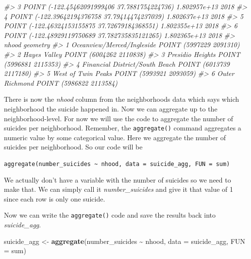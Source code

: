 \documentclass[
  12pt,
]{book}
\newenvironment{Shaded}{\begin{snugshade}}{\end{snugshade}}
\newcommand{\CommentTok}[1]{\textcolor[rgb]{0.37,0.37,0.37}{\textit{#1}}}
\newcommand{\DataTypeTok}[1]{\textcolor[rgb]{0.27,0.27,0.27}{#1}}
\newcommand{\DecValTok}[1]{\textcolor[rgb]{0.06,0.06,0.06}{#1}}
\newcommand{\KeywordTok}[1]{\textcolor[rgb]{0.27,0.27,0.27}{\textbf{#1}}}
\newcommand{\NormalTok}[1]{#1}
\newcommand{\OperatorTok}[1]{\textcolor[rgb]{0.43,0.43,0.43}{\textbf{#1}}}
\newcommand{\StringTok}[1]{\textcolor[rgb]{0.5,0.5,0.5}{#1}}
\begin{document}
\begin{Shaded}
\begin{Highlighting}[]
\CommentTok{\#\textgreater{} 3   POINT ({-}122.45462091999406 37.7881754224736) 1.802957e+13 2018}
\CommentTok{\#\textgreater{} 4  POINT ({-}122.39642194376758 37.79414474237039) 1.802637e+13 2018}
\CommentTok{\#\textgreater{} 5  POINT ({-}122.46324153155875 37.72679184368551) 1.802355e+13 2018}
\CommentTok{\#\textgreater{} 6 POINT ({-}122.48929119750689 37.782735835121265) 1.802365e+13 2018}
\CommentTok{\#\textgreater{}                            nhood                geometry}
\CommentTok{\#\textgreater{} 1     Oceanview/Merced/Ingleside POINT (5997229 2091310)}
\CommentTok{\#\textgreater{} 2                   Hayes Valley POINT (6004262 2110838)}
\CommentTok{\#\textgreater{} 3               Presidio Heights POINT (5996881 2115353)}
\CommentTok{\#\textgreater{} 4 Financial District/South Beach POINT (6013739 2117180)}
\CommentTok{\#\textgreater{} 5             West of Twin Peaks POINT (5993921 2093059)}
\CommentTok{\#\textgreater{} 6                 Outer Richmond POINT (5986822 2113584)}
\end{Highlighting}
\end{Shaded}

There is now the \emph{nhood} column from the neighborhoods data which says which neighborhood the suicide happened in. Now we can aggregate up to the neighborhood-level.
For now we will use the code to aggregate the number of suicides per neighborhood. Remember, the \texttt{aggregate()} command aggregates a numeric value by some categorical value. Here we aggregate the number of suicides per neighborhood. So our code will be

\texttt{aggregate(number\_suicides\ \textasciitilde{}\ nhood,\ data\ =\ suicide\_agg,\ FUN\ =\ sum)}

We actually don't have a variable with the number of suicides so we need to make that. We can simply call it \emph{number\_suicides} and give it that value of 1 since each row is only one suicide.

\begin{Shaded}
\end{Shaded}

Now we can write the \texttt{aggregate()} code and save the results back into \emph{suicide\_agg}.

\begin{Shaded}
\begin{Highlighting}[]
\NormalTok{suicide\_agg \textless{}{-}}\StringTok{ }\KeywordTok{aggregate}\NormalTok{(number\_suicides }\OperatorTok{\textasciitilde{}}\StringTok{ }\NormalTok{nhood, }\DataTypeTok{data =}\NormalTok{ suicide\_agg, }\DataTypeTok{FUN =}\NormalTok{ sum)}
\end{Highlighting}
\end{Shaded}
\end{document}
